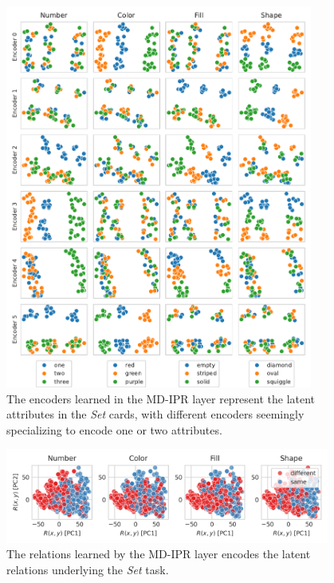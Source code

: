 \begin{figure}
    \centering
    \includegraphics[width=0.9\textwidth]{figs/representation_analysis/mdipr_encoders_rep.pdf}
    \caption{The encoders learned in the MD-IPR layer represent the latent attributes in the \textit{Set} cards, with different encoders seemingly specializing to encode one or two attributes.}\label{fig:mdirp_encoders_rep}
\end{figure}

\begin{figure}
    \centering
    \includegraphics[width=0.95\textwidth]{figs/representation_analysis/mdipr_rel_rep.png}
    \caption{The relations learned by the MD-IPR layer encodes the latent relations underlying the \textit{Set} task.}\label{fig:mdipr_rel_rep}
\end{figure}

